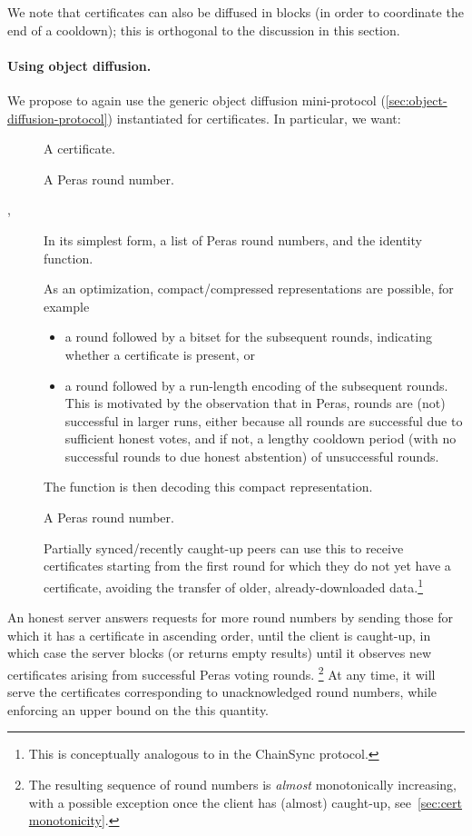 We note that certificates can also be diffused in blocks (in order to coordinate the end of a cooldown); this is orthogonal to the discussion in this section.

\paragraph{Using object diffusion.}

We propose to again use the generic object diffusion mini-protocol (\cref{sec:object-diffusion-protocol}) instantiated for certificates.
In particular, we want:

\begin{description}
\item []
  A certificate.
\item []
  A Peras round number.
\item [, ]
  In its simplest form, a list of Peras round numbers, and the identity function.

  As an optimization, compact/compressed representations are possible, for example
  \begin{itemize}
  \item
    a round followed by a bitset for the subsequent rounds, indicating whether a certificate is present, or
  \item
    a round followed by a run-length encoding of the subsequent rounds.
    This is motivated by the observation that in Peras, rounds are (not) successful in larger runs, either because all rounds are successful due to sufficient honest votes, and if not, a lengthy cooldown period (with no successful rounds to due honest abstention) of unsuccessful rounds.
  \end{itemize}
  The  function is then decoding this compact representation.
\item []
  A Peras round number.

  Partially synced/recently caught-up peers can use this to receive certificates starting from the first round for which they do not yet have a certificate, avoiding the transfer of older, already-downloaded data.\footnote{
  This is conceptually analogous to  in the ChainSync protocol.}
\end{description}

An honest server answers requests for more round numbers by sending those for which it has a certificate in ascending order, until the client is caught-up, in which case the server blocks (or returns empty results) until it observes new certificates arising from successful Peras voting rounds.%
\footnote{The resulting sequence of round numbers is \emph{almost} monotonically increasing, with a possible exception once the client has (almost) caught-up, see~\cref{sec:cert monotonicity}.}
At any time, it will serve the certificates corresponding to unacknowledged round numbers, while enforcing an upper bound on the this quantity.

